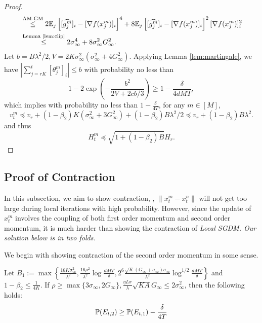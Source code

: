 \documentclass{article} %
\numberwithin{equation}{section}
\begin{document}
\begin{proof}
\begin{equation}
\begin{aligned}
            &\overset{\text{AM-GM}}{\leq} 2 \mathbb{E}_j \left[[\widehat{g_j^m}]_i - [\nabla f(x_j^m)]_i\right]^4 + 8\mathbb{E}_j \left[[\widehat{g_j^m}]_i - [\nabla f(x_j^m)]_i\right]^2[\nabla f(x_j^m)]_i^2 \\
            &\overset{\text{Lemma \ref{lem:clip}}}{\leq} 2\sigma_\infty^4 + 8\sigma_\infty^2G_\infty^2.
        \end{aligned}
    \end{equation}
    Let $b=B\lambda^2/2, V=2K\sigma_\infty^2(\sigma_\infty^2+4G_\infty^2)$.
    Applying Lemma \ref{lem:martingale}, we have $|\sum_{j=rK}^t[\theta_j^m]_i|\leq b$ with probability no less than 
    \begin{equation}
        1 - 2\exp{\left( -\frac{b^2}{2V+2cb/3}\right)} \geq 1-\frac{\delta}{4dMT},
    \end{equation}
    which implies with probability no less than $1-\frac{\delta}{4T}$, for any $m\in [M]$,
    \begin{equation}
        v_t^m \preceq v_r + (1-\beta_2)K(\sigma_\infty^2 + 3G_{\infty}^2) + (1-\beta_2)B\lambda^2/2
        \preceq v_r + (1-\beta_2)B\lambda^2.
    \end{equation}
    and thus
    \begin{equation}
        H_t^m \preceq \sqrt{1+(1-\beta_2)B} H_r.
    \end{equation}
\end{proof}

\subsection{Proof of Contraction}

    In this subsection, we aim to show contraction, \ie, $\|x_t^m-x_t^n\|$ will not get too large during local iterations with high probability. However, since the update of $x_t^m$ involves the coupling of both first order momentum and second order momentum, it is much harder than showing the contraction of \em Local \em SGDM. Our solution below is in two folds. 

    We begin with showing contraction of the second order momentum in some sense.

\begin{lemma}\label{lem:contraction_H}
    Let $B_1:=\max\left\{\frac{16K\sigma_\infty^2}{\lambda^2}, \frac{16\rho^2}{\lambda^2}\log\frac{dMT}{\delta}, 2^6\frac{\sqrt{K}(G_\infty+\sigma_\infty)\sigma_\infty}{\lambda^2}\log^{1/2}\frac{dMT}{\delta}\right\}$ and $1-\beta_2\leq \frac{1}{4K}$.
    If $\rho\geq \max\{3\sigma_\infty, 2G_\infty\}, \frac{\eta L\sigma}{\lambda}\sqrt{KA}G_{\infty}\leq 2\sigma_{\infty}^2$, then the following holds:
    \begin{equation}
        \mathbb{P} (E_{t,2})\geq \mathbb{P}(E_{t,1})-\frac{\delta}{4T}
    \end{equation}
\end{lemma}
\end{document}
